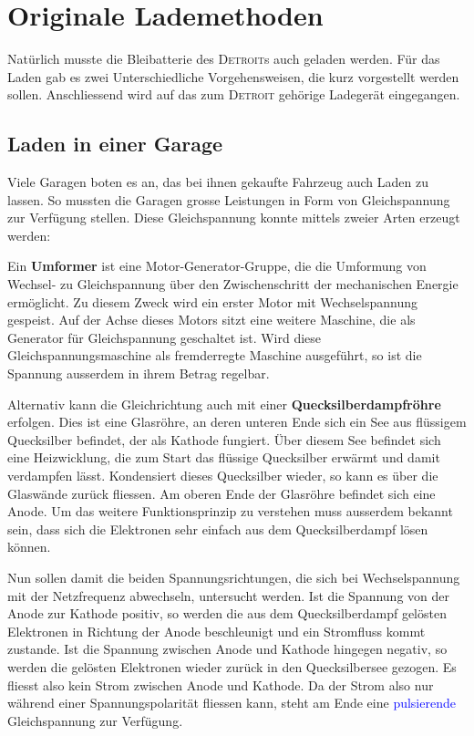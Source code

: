 \section{Originale Lademethoden}

Natürlich musste die Bleibatterie des \textsc{Detroit}s auch geladen werden. Für das Laden gab es zwei Unterschiedliche Vorgehensweisen, die kurz vorgestellt werden sollen. Anschliessend wird auf das zum \textsc{Detroit} gehörige Ladegerät eingegangen.

\subsection{Laden in einer Garage}
Viele Garagen boten es an, das bei ihnen gekaufte Fahrzeug auch Laden zu lassen. So mussten die Garagen grosse Leistungen in Form von Gleichspannung zur Verfügung stellen. Diese Gleichspannung konnte mittels zweier Arten erzeugt werden:

Ein \textbf{Umformer} ist eine Motor-Generator-Gruppe, die die Umformung von Wechsel- zu Gleichspannung über den Zwischenschritt der mechanischen Energie ermöglicht. Zu diesem Zweck wird ein erster Motor mit Wechselspannung gespeist. Auf der Achse dieses Motors sitzt eine weitere Maschine, die als Generator für Gleichspannung geschaltet ist. Wird diese Gleichspannungsmaschine als fremderregte Maschine ausgeführt, so ist die Spannung ausserdem in ihrem Betrag regelbar.

Alternativ kann die Gleichrichtung auch mit einer \textbf{Quecksilberdampfröhre} erfolgen. Dies ist eine Glasröhre, an deren unteren Ende sich ein See aus flüssigem Quecksilber befindet, der als Kathode fungiert. Über diesem See befindet sich eine Heizwicklung, die zum Start das flüssige Quecksilber erwärmt und damit verdampfen lässt. Kondensiert dieses Quecksilber wieder, so kann es über die Glaswände zurück fliessen. Am oberen Ende der Glasröhre befindet sich eine Anode. Um das weitere Funktionsprinzip zu verstehen muss ausserdem bekannt sein, dass sich die Elektronen sehr einfach aus dem Quecksilberdampf lösen können.

Nun sollen damit die beiden Spannungsrichtungen, die sich bei Wechselspannung mit der Netzfrequenz abwechseln, untersucht werden. Ist die Spannung von der Anode zur Kathode positiv, so werden die aus dem Quecksilberdampf gelösten Elektronen in Richtung der Anode beschleunigt und ein Stromfluss kommt zustande. Ist die Spannung zwischen Anode und Kathode hingegen negativ, so werden die gelösten Elektronen wieder zurück in den Quecksilbersee gezogen. Es fliesst also kein Strom zwischen Anode und Kathode. Da der Strom also nur während einer Spannungspolarität fliessen kann, steht am Ende eine \textcolor{blue}{pulsierende} Gleichspannung zur Verfügung.

